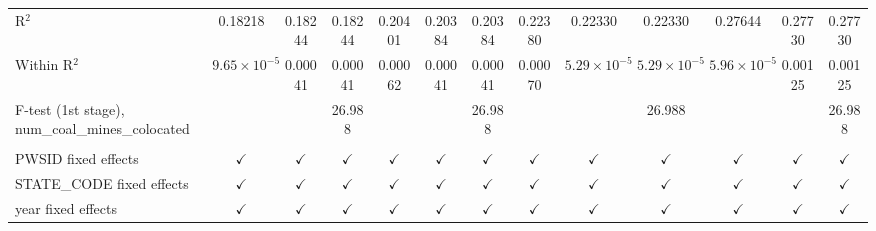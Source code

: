 \begin{table}[htbp]
\begin{adjustbox}{width = \textwidth, center}
\begin{tabular}{lcccccccccccc}
         R$^2$                                              & 0.18218               & 0.18244       & 0.18244       & 0.20401       & 0.20384       & 0.20384       & 0.22380       & 0.22330               & 0.22330               & 0.27644               & 0.27730       & 0.27730\\  
         Within R$^2$                                       & $9.65\times 10^{-5}$  & 0.00041       & 0.00041       & 0.00062       & 0.00041       & 0.00041       & 0.00070       & $5.29\times 10^{-5}$  & $5.29\times 10^{-5}$  & $5.96\times 10^{-5}$  & 0.00125       & 0.00125\\  
         F-test (1st stage), num\_coal\_mines\_colocated    &                       &               & 26.988        &               &               & 26.988        &               &                       & 26.988                &                       &               & 26.988\\  
          \\
         PWSID fixed effects                                & $\checkmark$          & $\checkmark$  & $\checkmark$  & $\checkmark$  & $\checkmark$  & $\checkmark$  & $\checkmark$  & $\checkmark$          & $\checkmark$          & $\checkmark$          & $\checkmark$  & $\checkmark$\\   
         STATE\_CODE fixed effects                          & $\checkmark$          & $\checkmark$  & $\checkmark$  & $\checkmark$  & $\checkmark$  & $\checkmark$  & $\checkmark$  & $\checkmark$          & $\checkmark$          & $\checkmark$          & $\checkmark$  & $\checkmark$\\   
         year fixed effects                                 & $\checkmark$          & $\checkmark$  & $\checkmark$  & $\checkmark$  & $\checkmark$  & $\checkmark$  & $\checkmark$  & $\checkmark$          & $\checkmark$          & $\checkmark$          & $\checkmark$  & $\checkmark$\\   
         \bottomrule
      \end{tabular}
   \end{adjustbox}
\end{table}



